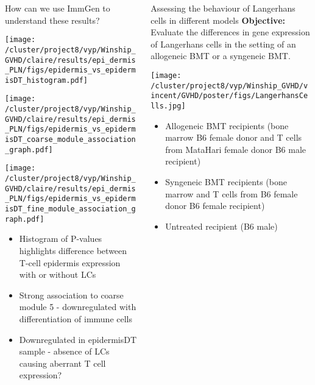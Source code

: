 \documentclass[final,hyperref={pdfpagelabels=false}]{beamer}
\begin{document}
\begin{frame}{}
\begin{columns}[t]
\begin{column}{.36\linewidth}
\begin{block}{How can we use ImmGen to understand these results?}
\begin{minipage}{0.30\textwidth}
        \texttt{[image: /cluster/project8/vyp/Winship\_GVHD/claire/results/epi\_dermis\_PLN/figs/epidermis\_vs\_epidermisDT\_histogram.pdf]}
      \end{minipage}
\hfill
  \begin{minipage}{0.30\textwidth}
    \texttt{[image: /cluster/project8/vyp/Winship\_GVHD/claire/results/epi\_dermis\_PLN/figs/epidermis\_vs\_epidermisDT\_coarse\_module\_association\_graph.pdf]}
  \end{minipage}
\hfill
\begin{minipage}{0.30\textwidth}
\texttt{[image: /cluster/project8/vyp/Winship\_GVHD/claire/results/epi\_dermis\_PLN/figs/epidermis\_vs\_epidermisDT\_fine\_module\_association\_graph.pdf]}
\end{minipage}
\hfill
{\small	  \begin{itemize}
 \item Histogram of P-values highlights difference between T-cell epidermis expression with or without LCs
  \item Strong association to coarse module 5 - downregulated with differentiation of immune cells
  \item Downregulated in epidermisDT sample - absence of LCs causing aberrant T cell expression? 
\end{itemize}}
    \end{block}
\end{column}

  \begin{column}{.36\linewidth}


    \begin{block}{Assessing the behaviour of Langerhans cells in different models}
  {\bf Objective:} Evaluate the differences in gene expression of Langerhans cells in the setting of an allogeneic BMT or a syngeneic BMT. 


  \begin{minipage}{20cm}
   \texttt{[image: /cluster/project8/vyp/Winship\_GVHD/vincent/GVHD/poster/figs/LangerhansCells.jpg]}
        \end{minipage}
{\small    \begin{itemize}
    \item Allogeneic BMT recipients (bone marrow B6 female donor and T cells from MataHari female donor B6 male recipient)
    \item Syngeneic BMT recipients (bone marrow and T cells from B6 female donor  B6 female recipient)
    \item Untreated recipient (B6 male)
    \end{itemize}}


\end{block}
\end{column}
\end{columns}
\end{frame}
\end{document}
